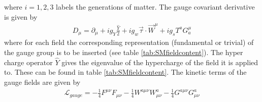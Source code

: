 where $i=1,2,3$ labels the generations of matter. The gauge covariant derivative is given by
\begin{align}
D_\mu = \partial_\mu + i g_Y\frac{\hat{Y}}{2} +ig_w \vec{\tau}\cdot \vec{W}^\mu + i g_s T^a G_a^\mu
\end{align}
where for each field the corresponding representation (fundamental or trivial) of the gauge group is to be inserted (see table \ref{tab:SMfieldcontent}). The hyper charge operator $\hat{Y}$ gives the eigenvalue of the hypercharge of the field it is applied to. These can be found in table \ref{tab:SMfieldcontent}.
The kinetic terms of the gauge fields are given by
\begin{align}
\mathcal{L}_{gauge} = -\frac{1}{4}F^{\mu\nu}F_{\mu\nu} - \frac{1}{4}W^{a\mu\nu}W^a_{\mu\nu} - \frac{1}{4}G^{a\mu\nu}G^a_{\mu\nu}
\end{align}


